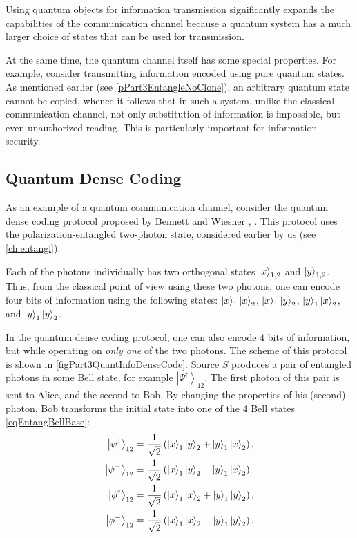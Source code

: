 Using quantum objects for information transmission significantly
expands the capabilities of the communication channel because a quantum system
has a much larger choice of states that can be used for
transmission.

At the same time, the quantum channel itself has some special
properties. For example, consider transmitting information encoded
using pure quantum states. As mentioned earlier (see \ref{pPart3EntangleNoClone}),
an arbitrary quantum state cannot be copied, whence
it follows that in such a system, unlike the classical communication channel,
not only substitution of information is impossible, but even unauthorized reading.
This is particularly important for information security. 

\subsection{Quantum Dense Coding}
\label{subsecPart3QuantInfoBigCoding}
As an example of a quantum communication channel, consider the quantum dense coding protocol proposed by Bennett and Wiesner
\cite{bBennettWiesner}, \cite{bDenseCodeExp}. This protocol
uses the polarization-entangled two-photon state,
considered earlier by us (see \autoref{ch:entangl}).  

Each of the photons individually has two orthogonal states 
$\ket{x}_{1,2}$ and $\ket{y}_{1,2}$. Thus, from
the classical point of view using these two photons, one can encode
four bits of information using the following
states:
$\ket{x}_1 \ket{x}_2$,
$\ket{x}_1 \ket{y}_2$,
$\ket{y}_1 \ket{x}_2$,
and 
$\ket{y}_1 \ket{y}_2$.



In the quantum dense coding protocol, one can also encode 4
bits of information, but while operating on {\it only one} of the two 
photons. The scheme of this protocol is shown in
\autoref{figPart3QuantInfoDenseCode}. Source $S$ produces a pair
of entangled photons in some Bell state, for example
$\left|\Psi^{\dag}\right>_{12}$. The first photon of this pair is sent to Alice,
and the second to Bob. By changing the properties of his (second) photon, Bob
transforms the initial state into one of the 4 Bell states \eqref{eqEntangBellBase}:
\begin{eqnarray}
  \left|\psi^{\dag}\right>_{12} = 
  \frac{1}{\sqrt{2}}\left(
  \ket{x}_1\ket{y}_2 + 
  \ket{y}_1\ket{x}_2
  \right),
  \nonumber \\
  \left|\psi^{-}\right>_{12} = 
  \frac{1}{\sqrt{2}}\left(
  \ket{x}_1\ket{y}_2 - 
  \ket{y}_1\ket{x}_2
  \right),
  \nonumber \\
  \left|\phi^{\dag}\right>_{12} = 
  \frac{1}{\sqrt{2}}\left(
  \ket{x}_1\ket{x}_2 + 
  \ket{y}_1\ket{y}_2
  \right),
  \nonumber \\
  \left|\phi^{-}\right>_{12} = 
  \frac{1}{\sqrt{2}}\left(
  \ket{x}_1\ket{x}_2 - 
  \ket{y}_1\ket{y}_2
  \right).
  \label{eqQuantInfoBellBase}
\end{eqnarray}

